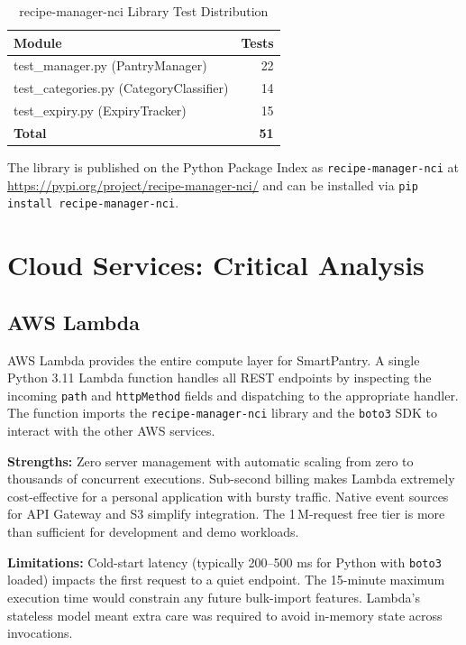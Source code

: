\documentclass[conference]{IEEEtran}
\begin{document}
\begin{table}[htbp]
\centering
\caption{recipe-manager-nci Library Test Distribution}
\begin{tabular}{lr}
\toprule
\textbf{Module} & \textbf{Tests} \\
\midrule
test\_manager.py (PantryManager) & 22 \\
test\_categories.py (CategoryClassifier) & 14 \\
test\_expiry.py (ExpiryTracker) & 15 \\
\midrule
\textbf{Total} & \textbf{51} \\
\bottomrule
\end{tabular}
\label{tab:libtests}
\end{table}

The library is published on the Python Package Index as \texttt{recipe-manager-nci} at \url{https://pypi.org/project/recipe-manager-nci/} and can be installed via \texttt{pip install recipe-manager-nci}.

\section{Cloud Services: Critical Analysis}

\subsection{AWS Lambda}

AWS Lambda provides the entire compute layer for SmartPantry. A single Python 3.11 Lambda function handles all REST endpoints by inspecting the incoming \texttt{path} and \texttt{httpMethod} fields and dispatching to the appropriate handler. The function imports the \texttt{recipe-manager-nci} library and the \texttt{boto3} SDK to interact with the other AWS services.

\textbf{Strengths:} Zero server management with automatic scaling from zero to thousands of concurrent executions. Sub-second billing makes Lambda extremely cost-effective for a personal application with bursty traffic. Native event sources for API Gateway and S3 simplify integration. The 1\,M-request free tier is more than sufficient for development and demo workloads.

\textbf{Limitations:} Cold-start latency (typically 200--500 ms for Python with \texttt{boto3} loaded) impacts the first request to a quiet endpoint. The 15-minute maximum execution time would constrain any future bulk-import features. Lambda's stateless model meant extra care was required to avoid in-memory state across invocations.
\end{document}
